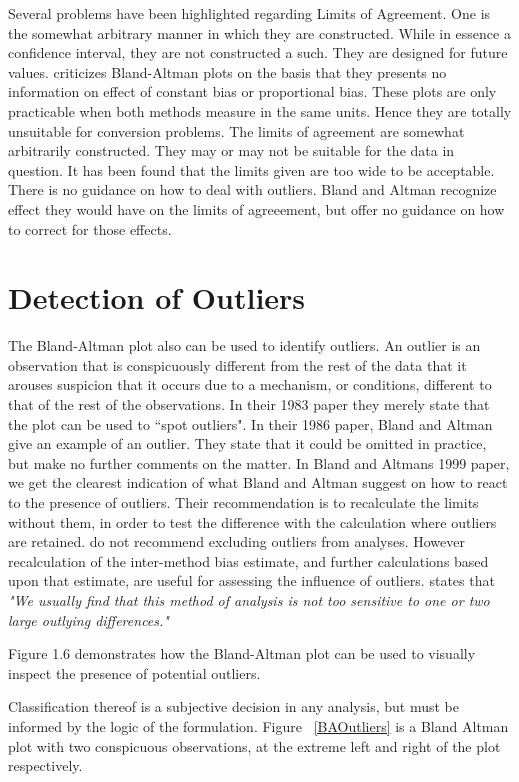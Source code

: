 \documentclass[12pt, a4paper]{report}
\theoremstyle{plain}
\theoremstyle{definition}
\theoremstyle{remark}
\begin{document}
Several problems have been highlighted regarding Limits of Agreement. One is the somewhat arbitrary manner in which they are
constructed. While in essence a confidence interval, they are not constructed a such. They are designed for future values.
\citet{ludbrook97,ludbrook02} criticizes Bland-Altman plots on the
basis that they presents no information on effect of constant bias
or proportional bias. These plots are only practicable when both
methods measure in the same units. Hence they are totally
unsuitable for conversion problems. The limits of agreement are
somewhat arbitrarily constructed. They may or may not be suitable
for the data in question. It has been found that the limits given
are too wide to be acceptable. There is no guidance on how to deal
with outliers. Bland and Altman recognize effect they would have
on the limits of agreeement, but offer no guidance on how to
correct for those effects.	

\section{Detection of Outliers}
The Bland-Altman plot also can be used to identify outliers. An outlier is an observation that is conspicuously different from the rest of the data that it arouses suspicion that it occurs due to a mechanism, or conditions, different to that of the rest of the observations. In their 1983 paper they merely state that the plot can be used to
``spot outliers". In  their 1986 paper, Bland and Altman give an example of an
outlier. They state that it could be omitted in practice, but make
no further comments on the matter. In Bland and Altmans 1999 paper, we get the clearest indication of
what Bland and Altman suggest on how to react to the presence of
outliers. Their recommendation is to recalculate the limits
without them, in order to test the difference with the calculation
where outliers are retained. \citet*{BA99} do not recommend excluding outliers from analyses. However recalculation of the inter-method bias estimate, and further calculations based upon that estimate, are useful for assessing the influence of outliers. \citet{BA99} states that \emph{"We usually find that this method of analysis is not too sensitive to one or two large outlying differences."}
	
 Figure 1.6 demonstrates how the Bland-Altman plot can be used to visually inspect the presence of potential outliers.

Classification thereof is a subjective decision in any analysis, but must be informed by the logic of the formulation. Figure ~\ref{BAOutliers} is a Bland Altman plot with two
	conspicuous observations, at the extreme left and right of the
	plot respectively.
	
\end{document}
